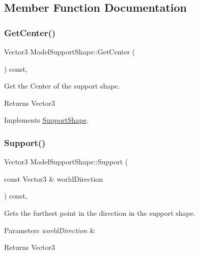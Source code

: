 \subsection{Member Function Documentation}
\mbox{\label{classModelSupportShape_a006fee2a4fca1a9b15194512a072a8e0}} 
\subsubsection{\texorpdfstring{Get\+Center()}{GetCenter()}}
{\footnotesize\ttfamily Vector3 Model\+Support\+Shape\+::\+Get\+Center (\begin{DoxyParamCaption}{ }\end{DoxyParamCaption}) const\hspace{0.3cm}{\ttfamily [override]}, {\ttfamily [virtual]}}



Get the Center of the support shape. 

\begin{DoxyReturn}{Returns}
Vector3 
\end{DoxyReturn}


Implements \hyperlink{classSupportShape_ac81f62a38aeadbf03d637e5134479467}{Support\+Shape}.

\mbox{\label{classModelSupportShape_aa15c689024a0e86594fec5461c67f808}} 
\subsubsection{\texorpdfstring{Support()}{Support()}}
{\footnotesize\ttfamily Vector3 Model\+Support\+Shape\+::\+Support (\begin{DoxyParamCaption}\item[{const Vector3 \&}]{world\+Direction }\end{DoxyParamCaption}) const\hspace{0.3cm}{\ttfamily [override]}, {\ttfamily [virtual]}}



Gets the furthest point in the direction in the support shape. 


\begin{DoxyParams}{Parameters}
{\em world\+Direction} & \\
\hline
\end{DoxyParams}
\begin{DoxyReturn}{Returns}
Vector3 
\end{DoxyReturn}


